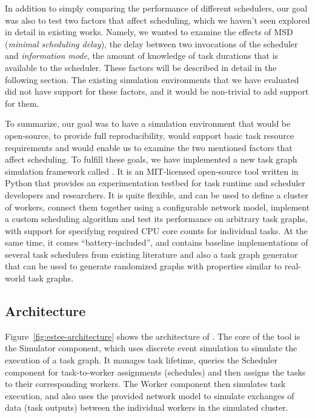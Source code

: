 In addition to simply comparing the performance of different schedulers, our goal was also to test
two factors that affect scheduling, which we haven't seen explored in detail in existing works.
Namely, we wanted to examine the effects of MSD (\emph{minimal scheduling delay}), the delay between two
invocations of the scheduler and \emph{information mode}, the amount of knowledge of task durations
that is available to the scheduler. These factors will be described in detail in the following
section. The existing simulation environments that we have evaluated did not have support for these
factors, and it would be non-trivial to add support for them.

To summarize, our goal was to have a simulation environment that would be open-source, to provide
full reproducibility, would support basic task resource requirements and would enable us to examine
the two mentioned factors that affect scheduling. To fulfill these goals, we have implemented a new
task graph simulation framework called \estee{}. It is an \mbox{MIT-licensed}
open-source tool written in Python that provides an experimentation testbed
for task runtime and scheduler developers and researchers. It is quite flexible, and can be used to
define a cluster of workers, connect them together using a configurable network model, implement a
custom scheduling algorithm and test its performance on arbitrary task graphs, with support for
specifying required CPU core counts for individual tasks. At the same time, it comes
``battery-included'', and contains baseline implementations of several task schedulers from
existing literature and also a task graph generator that can be used to generate randomized graphs
with properties similar to real-world task graphs.

\subsection{Architecture}
Figure~\ref{fig:estee-architecture} shows the architecture of \estee{}. The core of the
tool is the Simulator component, which uses discrete event simulation to simulate the execution of
a task graph. It manages task lifetime, queries the Scheduler component for task-to-worker
assignments (schedules) and then assigns the tasks to their corresponding workers. The Worker
component then simulates task execution, and also uses the provided network model to simulate
exchanges of data (task outputs) between the individual workers in the simulated cluster.

